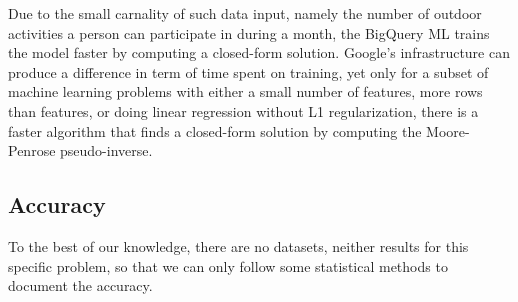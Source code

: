 Due to the small carnality of such data input, namely the number of outdoor activities a person can participate in during a month, the BigQuery ML trains the model faster by computing a closed-form solution. \cite{a3} Google's infrastructure can produce a difference in term of time spent on training, yet only for a subset of machine learning problems with either a small number of features, more rows than features, or doing linear regression without L1 regularization, there is a faster algorithm that finds a closed-form solution by computing the Moore-Penrose pseudo-inverse.

\subsection*{Accuracy}

To the best of our knowledge, there are no datasets, neither results for this specific problem, so that we can only follow some statistical methods to document the accuracy. 

